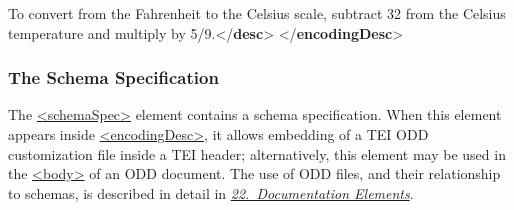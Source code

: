 \begin{shaded}
\hspace*{1em}\hspace*{1em}To convert from the Fahrenheit to the Celsius scale, subtract 32 from the Celsius temperature and multiply by 5/9.{</\textbf{desc}>}\mbox{}\newline 
\hspace*{1em}\mbox{}\newline 
{}\mbox{}\newline 
{</\textbf{encodingDesc}>}\end{shaded}\egroup\par 
\subsubsection[{The Schema Specification}]{The Schema Specification}\label{HDSCHSPEC}\par
The \hyperref[TEI.schemaSpec]{<schemaSpec>} element contains a schema specification. When this element appears inside \hyperref[TEI.encodingDesc]{<encodingDesc>}, it allows embedding of a TEI ODD customization file inside a TEI header; alternatively, this element may be used in the \hyperref[TEI.body]{<body>} of an ODD document. The use of ODD files, and their relationship to schemas, is described in detail in \textit{\hyperref[TD]{22.\ Documentation Elements}}.\par
